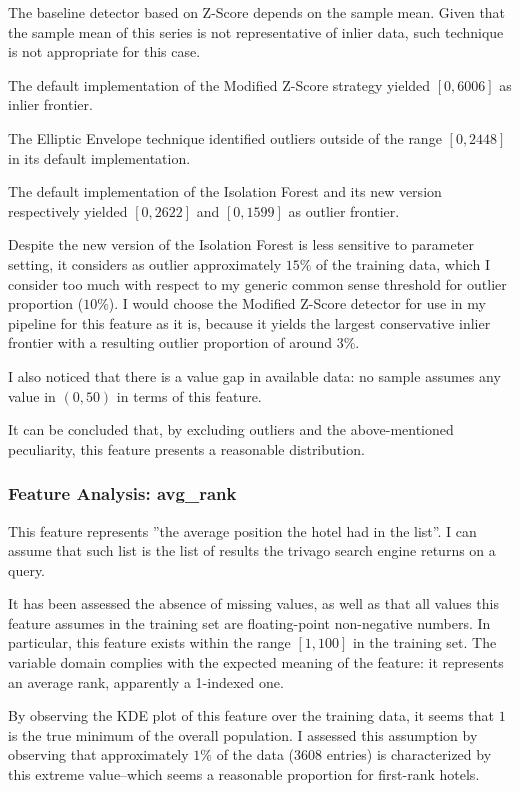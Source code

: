 \documentclass[preprint,12pt,3p]{elsarticle}
\begin{document}
The baseline detector based on Z-Score depends on the sample mean. Given that the sample mean of this series is not representative of inlier data, such technique is not appropriate for this case.

The default implementation of the Modified Z-Score strategy yielded $[0,6006]$ as inlier frontier.

The Elliptic Envelope technique identified outliers outside of the range $[0,2448]$ in its default implementation.

The default implementation of the Isolation Forest and its new version respectively yielded $[0,2622]$ and $[0,1599]$ as outlier frontier.

Despite the new version of the Isolation Forest is less sensitive to parameter setting, it considers as outlier approximately $15\%$ of the training data, which I consider too much with respect to my generic common sense threshold for outlier proportion ($10\%$). I would choose the Modified Z-Score detector for use in my pipeline for this feature as it is, because it yields the largest conservative inlier frontier with a resulting outlier proportion of around $3\%$.

I also noticed that there is a value gap in available data: no sample assumes any value in $(0,50)$ in terms of this feature.

It can be concluded that, by excluding outliers and the above-mentioned peculiarity, this feature presents a reasonable distribution.

\subsubsection{Feature Analysis: avg\_rank}
This feature represents ''the average position the hotel had in the list''. I can assume that such list is the list of results the trivago search engine returns on a query.

It has been assessed the absence of missing values, as well as that all values this feature assumes in the training set are floating-point non-negative numbers. In particular, this feature exists within the range $[1,100]$ in the training set. The variable domain complies with the expected meaning of the feature: it represents an average rank, apparently a  1-indexed one.

By observing the KDE plot of this feature over the training data, it seems that $1$ is the true minimum of the overall population. I assessed this assumption by observing that approximately $1\%$ of the data ($3608$ entries) is characterized by this extreme value--which seems a reasonable proportion for first-rank hotels.
\end{document}
